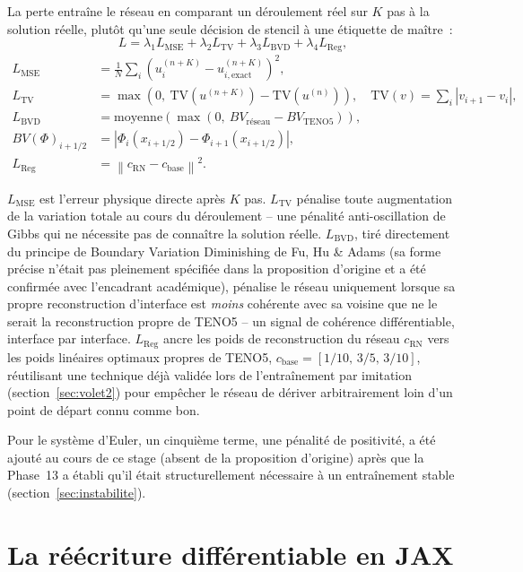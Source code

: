 \documentclass[11pt]{article}
\begin{document}
La perte entraîne le réseau en comparant un déroulement réel sur $K$ pas à
la solution réelle, plutôt qu'une seule décision de stencil à une
étiquette de maître~:
\[
L = \lambda_1 L_{\text{MSE}} + \lambda_2 L_{\text{TV}}
  + \lambda_3 L_{\text{BVD}} + \lambda_4 L_{\text{Reg}},
\]
\begin{align*}
L_{\text{MSE}} &= \frac{1}{N}\sum_i \left(u_i^{(n+K)} - u_{i,\text{exact}}^{(n+K)}\right)^2, \\
L_{\text{TV}} &= \max\!\left(0,\ \mathrm{TV}(u^{(n+K)}) - \mathrm{TV}(u^{(n)})\right),
\quad \mathrm{TV}(v) = \sum_i |v_{i+1}-v_i|, \\
L_{\text{BVD}} &= \mathrm{moyenne}\!\left(\max\!\left(0,\ BV_{\text{réseau}} - BV_{\text{TENO5}}\right)\right), \\
BV(\Phi)_{i+1/2} &= \left|\Phi_i(x_{i+1/2}) - \Phi_{i+1}(x_{i+1/2})\right|, \\
L_{\text{Reg}} &= \left\| c_{\text{RN}} - c_{\text{base}} \right\|^2.
\end{align*}

$L_{\text{MSE}}$ est l'erreur physique directe après $K$ pas.
$L_{\text{TV}}$ pénalise toute augmentation de la variation totale au
cours du déroulement -- une pénalité anti-oscillation de Gibbs qui ne
nécessite pas de connaître la solution réelle. $L_{\text{BVD}}$, tiré
directement du principe de Boundary Variation Diminishing de Fu, Hu \&
Adams (sa forme précise n'était pas pleinement spécifiée dans la
proposition d'origine et a été confirmée avec l'encadrant académique),
pénalise le réseau uniquement lorsque sa propre reconstruction
d'interface est \emph{moins} cohérente avec sa voisine que ne le serait
la reconstruction propre de TENO5 -- un signal de cohérence différentiable,
interface par interface. $L_{\text{Reg}}$ ancre les poids de
reconstruction du réseau $c_{\text{RN}}$ vers les poids linéaires
optimaux propres de TENO5, $c_{\text{base}} = [1/10,\,3/5,\,3/10]$,
réutilisant une technique déjà validée lors de l'entraînement par
imitation (section~\ref{sec:volet2}) pour empêcher le réseau de dériver
arbitrairement loin d'un point de départ connu comme bon.

Pour le système d'Euler, un cinquième terme, une pénalité de positivité, a
été ajouté au cours de ce stage (absent de la proposition d'origine) après
que la Phase~13 a établi qu'il était structurellement nécessaire à un
entraînement stable (section~\ref{sec:instabilite}).

\section{La réécriture différentiable en JAX}
\label{sec:jax}
\end{document}
